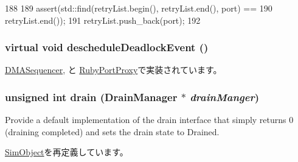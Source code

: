 \begin{DoxyCode}
188     {
189         assert(std::find(retryList.begin(), retryList.end(), port) ==
190                retryList.end());
191         retryList.push_back(port);
192     }
\end{DoxyCode}
\hypertarget{classRubyPort_ae635736b1bd64144a8f1fc5f42948b21}{
\subsubsection[{descheduleDeadlockEvent}]{\setlength{\rightskip}{0pt plus 5cm}virtual void descheduleDeadlockEvent ()}}
\label{classRubyPort_ae635736b1bd64144a8f1fc5f42948b21}


\hyperlink{classDMASequencer_a7c9a8861621a62055761f47310814762}{DMASequencer}, と \hyperlink{classRubyPortProxy_a7c9a8861621a62055761f47310814762}{RubyPortProxy}で実装されています。\hypertarget{classRubyPort_aa8a18d230dba7a674ac8a0b4f35bc36a}{
\subsubsection[{drain}]{\setlength{\rightskip}{0pt plus 5cm}unsigned int drain ({\bf DrainManager} $\ast$ {\em drainManger})}}
\label{classRubyPort_aa8a18d230dba7a674ac8a0b4f35bc36a}
Provide a default implementation of the drain interface that simply returns 0 (draining completed) and sets the drain state to Drained. 

\hyperlink{classSimObject_a6bf479c521c7c3eb473822d953275b26}{SimObject}を再定義しています。


